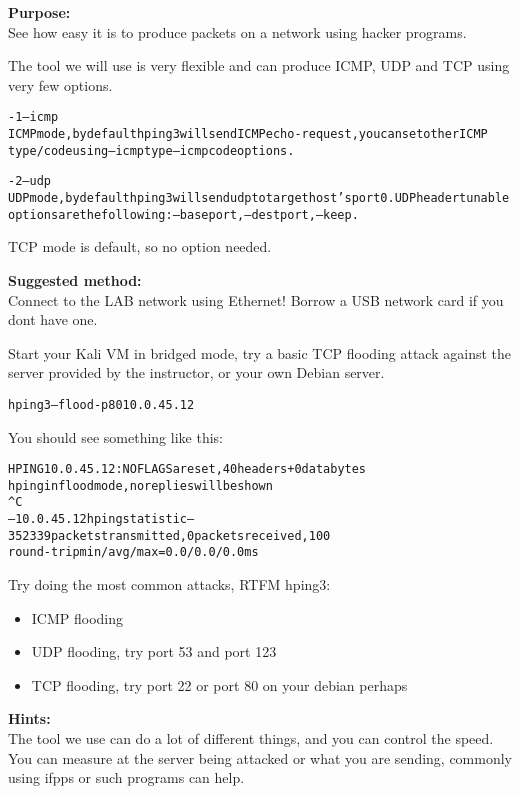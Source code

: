 \documentclass[a4paper,11pt,notitlepage]{report}
\begin{document}
{\bf Purpose:}\\
See how easy it is to produce packets on a network using hacker programs.

The tool we will use is very flexible and can produce ICMP, UDP and TCP using very few options.

\begin{alltt}\footnotesize
-1 --icmp
       ICMP  mode,  by  default  hping3  will  send  ICMP echo-request, you can set other ICMP
       type/code using --icmptype --icmpcode options.

-2 --udp
       UDP mode, by default hping3 will send udp to target host's port 0.  UDP header  tunable
       options are the following: --baseport, --destport, --keep.
\end{alltt}

TCP mode is default, so no option needed.


{\bf Suggested method:}\\
Connect to the LAB network using Ethernet! Borrow a USB network card if you dont have one.

Start your Kali VM in bridged mode, try a basic TCP flooding attack against the server provided by the instructor, or your own Debian server.

\begin{alltt}\footnotesize
hping3 --flood -p 80 10.0.45.12
\end{alltt}

You should see something like this:
\begin{alltt}\footnotesize
HPING 10.0.45.12: NO FLAGS are set, 40 headers + 0 data bytes
hping in flood mode, no replies will be shown
^C
--- 10.0.45.12 hping statistic ---
352339 packets transmitted, 0 packets received, 100% packet loss
round-trip min/avg/max = 0.0/0.0/0.0 ms
\end{alltt}

Try doing the most common attacks, RTFM hping3:
\begin{itemize}
\item ICMP flooding
\item UDP flooding, try port 53 and port 123
\item TCP flooding, try port 22 or port 80 on your debian perhaps
\end{itemize}


{\bf Hints:}\\
The tool we use can do a lot of different things, and you can control the speed. You can measure at the server being attacked or what you are sending, commonly using ifpps or such programs can help.
\end{document}
